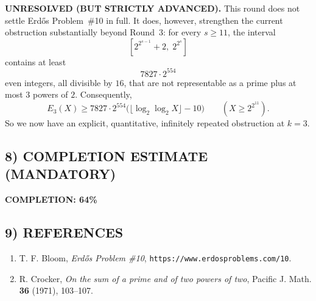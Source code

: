 \noindent\textbf{UNRESOLVED (BUT STRICTLY ADVANCED).}
This round does not settle Erd\H{o}s Problem~\#10 in full. It does, however, strengthen the current obstruction substantially beyond Round~3:
for every $s\ge 11$, the interval
\[
[2^{2^{s-1}}+2,\;2^{2^s}]
\]
contains at least
\[
7827\cdot 2^{554}
\]
even integers, all divisible by $16$, that are not representable as a prime plus at most $3$ powers of $2$.
Consequently,
\[
E_3(X)\ge 7827\cdot 2^{554}\bigl(\lfloor \log_2\log_2 X\rfloor-10\bigr)
\qquad (X\ge 2^{2^{11}}).
\]
So we now have an explicit, quantitative, infinitely repeated obstruction at $k=3$.

\subsection{8) COMPLETION ESTIMATE (MANDATORY)}

\noindent\textbf{COMPLETION: 64\%}

\subsection{9) REFERENCES}

\begin{enumerate}
\item T. F. Bloom, \emph{Erd\H{o}s Problem \#10}, \texttt{https://www.erdosproblems.com/10}.
\item R. Crocker, \emph{On the sum of a prime and of two powers of two}, Pacific J. Math. \textbf{36} (1971), 103--107.
\end{enumerate}